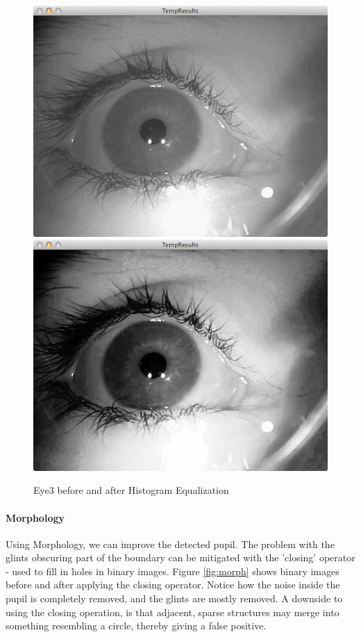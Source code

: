 \documentclass[a4paper,11pt]{article}
\begin{document}
\begin{figure}[ht]
  \centering
  \includegraphics[scale=0.2]{eye3}
  \includegraphics[scale=0.2]{eye3_hist_eq}
  \caption{Eye3 before and after Histogram Equalization}
  \label{fig:eye3_hist_eq}
\end{figure}

\paragraph{Morphology}
Using Morphology, we can improve the detected pupil. The problem with the glints obscuring part of the boundary can be mitigated with the 'closing' operator - used to fill in holes in binary images. Figure \ref{fig:morph} shows binary images before and after applying the closing operator. Notice how the noise inside the pupil is completely removed, and the glints are mostly removed.
A downside to using the closing operation, is that adjacent, sparse structures may merge into something resembling a circle, thereby giving a false positive.
\end{document}

